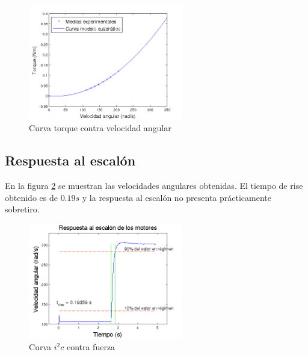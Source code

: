 \documentclass[main]{subfiles}
\begin{document}
\begin{figure}
  \begin{center}
	\includegraphics[width=0.6\textwidth]{./pics_motores/torque.png}
  \end{center}
  \caption{Curva torque contra velocidad angular}
  \label{fig:torque}
\end{figure}

\subsection{Respuesta al escal\'on}

En la figura \ref{fig:resp_esc} se muestran las velocidades angulares obtenidas. El tiempo de rise obtenido es de $0.19s$ y la respuesta al escal\'on no presenta pr\'acticamente sobretiro.


\begin{figure}[h]
  \begin{center}
	\includegraphics[width=0.6\textwidth]{./pics_motores/resp_esc.png}
  \end{center}
  \caption{Curva $i^2c$ contra fuerza}
  \label{fig:resp_esc}
\end{figure}
\end{document}
